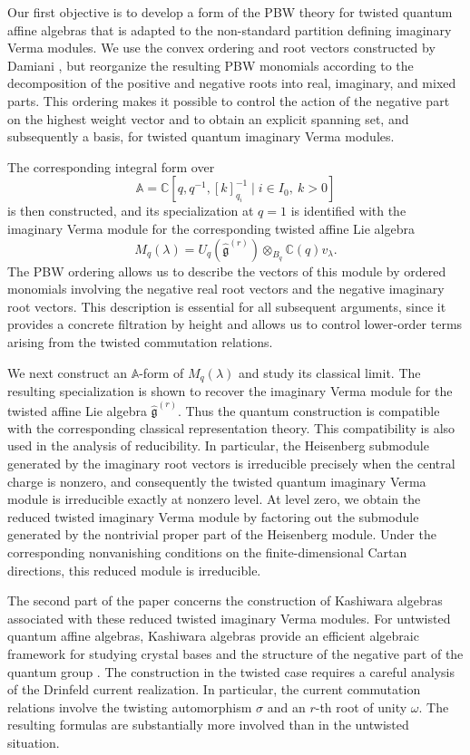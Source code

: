 \documentclass[12pt]{amsart}
\numberwithin{equation}{section}
\begin{document}
Our first objective is to develop a form of the PBW theory for twisted quantum affine algebras that is adapted to the non-standard partition defining imaginary Verma modules. We use the convex ordering and root vectors constructed by Damiani \cite{D}, but reorganize the resulting PBW monomials according to the decomposition of the positive and negative roots into real, imaginary, and mixed parts. This ordering makes it possible to control the action of the negative part on the highest weight vector and to obtain an explicit spanning set, and subsequently a basis, for twisted quantum imaginary Verma modules. 
 



The corresponding integral form over
\[
\mathbb A=\mathbb C[q,q^{-1},[k]_{q_i}^{-1}\mid i\in I_0,\ k>0]
\]
is then constructed, and its specialization at $q=1$ is identified with the imaginary Verma module for the corresponding twisted affine Lie algebra
\[
M_q(\lambda)=U_q(\widehat{\mathfrak g}^{(r)})
\otimes_{B_q}\mathbb C(q)v_\lambda.
\]
The PBW ordering allows us to describe the vectors of this module by ordered monomials involving the negative real root vectors and the negative imaginary root vectors. This description is essential for all subsequent arguments, since it provides a concrete filtration by height and allows us to control lower-order terms arising from the twisted commutation relations.

We next construct an $\mathbb A$-form of $M_q(\lambda)$ and study its classical limit. The resulting specialization is shown to recover the imaginary Verma module for the twisted affine Lie algebra $\widehat{\mathfrak g}^{(r)}$. Thus the quantum construction is compatible with the corresponding classical representation theory. This compatibility is also used in the analysis of reducibility. In particular, the Heisenberg submodule generated by the imaginary root vectors is irreducible precisely when the central charge is nonzero, and consequently the twisted quantum imaginary Verma module is irreducible exactly at nonzero level. At level zero, we obtain the reduced twisted imaginary Verma module by factoring out the submodule generated by the nontrivial proper part of the Heisenberg module. Under the corresponding nonvanishing conditions on the finite-dimensional Cartan directions, this reduced module is irreducible.

The second part of the paper concerns the construction of Kashiwara algebras associated with these reduced twisted imaginary Verma modules. For untwisted quantum affine algebras, Kashiwara algebras provide an efficient algebraic framework for studying crystal bases and the structure of the negative part of the quantum group \cite{CFM01,AFM}. The construction in the twisted case requires a careful analysis of the Drinfeld current realization. In particular, the current commutation relations involve the twisting automorphism $\sigma$ and an $r$-th root of unity $\omega$. The resulting formulas are substantially more involved than in the untwisted situation. 
\end{document}
